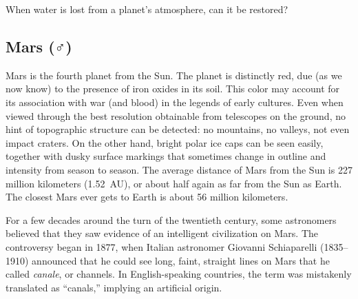 \documentclass{article}
\numberwithin{equation}{section}
\numberwithin{figure}{section}
\begin{document}
\begin{exercise}
    When water is lost from a planet's atmosphere, can it be restored?
\end{exercise}

\clearpage

\subsection{Mars ($\Mars$)} \label{3uBag7}

Mars is the fourth planet from the Sun. The planet is distinctly red, due (as we now know) to the presence of iron oxides in its soil. This color may account for its association with war (and blood) in the legends of early cultures. Even when viewed through the best resolution obtainable from telescopes on the ground, no hint of topographic structure can be detected: no mountains, no valleys, not even impact craters. On the other hand, bright polar ice caps can be seen easily, together with dusky surface markings that sometimes change in outline and intensity from season to season. The average distance of Mars from the Sun is 227 million kilometers (\SI{1.52}{AU}), or about half again as far from the Sun as Earth. The closest Mars ever gets to Earth is about 56 million kilometers.

\begin{center}
    \captionsetup{margin=1in,type=figure,font=scriptsize}
\end{center}

For a few decades around the turn of the twentieth century, some astronomers believed that they saw evidence of an intelligent civilization on Mars. The controversy began in 1877, when Italian astronomer Giovanni Schiaparelli (1835--1910) announced that he could see long, faint, straight lines on Mars that he called \textit{canale}, or channels. In English-speaking countries, the term was mistakenly translated as ``canals,'' implying an artificial origin.
\end{document}
